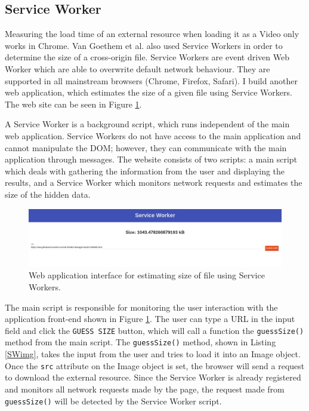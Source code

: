 \documentclass[10pt,a4paper,twoside]{book}
\begin{document}

\subsection{Service Worker}

Measuring the load time of an external resource when loading it as a Video only works in Chrome. Van Goethem et al. \cite{van2015clock} also used Service Workers in order to determine the size of a cross-origin file. Service Workers are event driven Web Worker which are able to overwrite default network behaviour. They are supported in all mainstream browsers (Chrome, Firefox, Safari). I build another web application, which estimates the size of a given file using Service Workers. The web site can be seen in Figure \ref{fig:swguess}.

A Service Worker is a background script, which runs independent of the main web application. Service Workers do not have access to the main application and cannot manipulate the DOM; however, they can communicate with the main application through messages. The website consists of two scripts: a main script which deals with gathering the information from the user and displaying the results, and a Service Worker which monitors network requests and estimates the size of the hidden data.

\begin{figure}[h]
\centering
\includegraphics[width=\textwidth]{figures/sw_size.png}
\caption{Web application interface for estimating size of file using Service Workers.}
\label{fig:swguess}
\end{figure}

The main script is responsible for monitoring the user interaction with the application front-end shown in Figure \ref{fig:swguess}. The user can type a URL in the input field and click the \texttt{GUESS SIZE} button, which will call a function the \texttt{guessSize()} method from the main script. The \texttt{guessSize()} method, shown in Listing \ref{SWimg}, takes the input from the user and tries to load it into an Image object. Once the \texttt{src} attribute on the Image object is set, the browser will send a request to download the external resource. Since the Service Worker is already registered and monitors all network requests made by the page, the request made from \texttt{guessSize()} will be detected by the Service Worker script.
\end{document}
